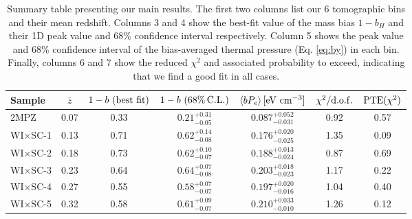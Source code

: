 \documentclass[useAMS,usenatbib]{mn2e}
\newcommand{\wisc}{WI$\times$SC}
\begin{document}
      \begin{table}
        \begin{center}
          \begin{tabular}{l|cccccc}
            \hline
            Sample & $\bar{z}$ & $1-b\,\,({\rm best\,\,fit})$ & $1-b\,\,(68\%\,{\rm C.L.})$ & $\langle bP_e\rangle\,[{\rm eV}\,\,{\rm cm}^{-3}]$ & $\chi^2/{\rm d.o.f.}$ & ${\rm PTE}(\chi^2)$\\[1ex]
            \hline
            2MPZ    & 0.07     & 0.33                         & $0.21^{+0.31}_{-0.05}$      & $0.087^{+0.052}_{-0.031}$                          & 0.92                  & 0.57               \\
            \wisc-1 & 0.13     & 0.71                         & $0.62^{+0.14}_{-0.08}$      & $0.176^{+0.020}_{-0.025}$                          & 1.35                  & 0.09               \\
            \wisc-2 & 0.18     & 0.73                         & $0.62^{+0.10}_{-0.07}$      & $0.188^{+0.013}_{-0.024}$                          & 0.87                  & 0.69               \\
            \wisc-3 & 0.23     & 0.64                         & $0.64^{+0.07}_{-0.08}$      & $0.203^{+0.018}_{-0.023}$                          & 1.17                  & 0.22               \\
            \wisc-4 & 0.27     & 0.55                         & $0.58^{+0.07}_{-0.07}$      & $0.197^{+0.020}_{-0.016}$                          & 1.04                  & 0.40               \\
            \wisc-5 & 0.32     & 0.58                         & $0.61^{+0.09}_{-0.07}$      & $0.210^{+0.033}_{-0.010}$                          & 1.26                  & 0.12               \\
            \hline
          \end{tabular}
          \caption{Summary table presenting our main results. The first two columns list our 6 tomographic bins and their mean redshift. Columns 3 and 4 show the best-fit value of the mass bias $1-b_H$ and their 1D peak value and 68\% confidence interval respectively. Column 5 shows the peak value and 68\% confidence interval of the bias-averaged thermal pressure (Eq. \ref{eq:by}) in each bin. Finally, columns 6 and 7 show the reduced $\chi^2$ and associated probability to exceed, indicating that we find a good fit in all cases.}\label{tab:results}
        \end{center}
      \end{table}
\end{document}
